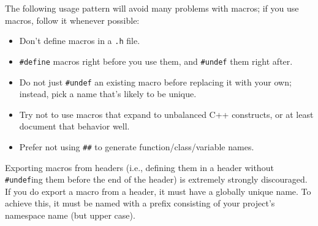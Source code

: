 The following usage pattern will avoid many problems with macros; if you use macros, follow it whenever possible:

\begin{itemize}
    \item Don't define macros in a \texttt{.h} file.
    \item \texttt{#define} macros right before you use them, and \texttt{#undef} them right after.
    \item Do not just \texttt{#undef} an existing macro before replacing it with your own; instead, pick a name that's likely to be unique.
    \item Try not to use macros that expand to unbalanced C++ constructs, or at least document that behavior well.
    \item Prefer not using \texttt{##} to generate function/class/variable names.
\end{itemize}

Exporting macros from headers (i.e., defining them in a header without \texttt{#undef}ing them before the end of the header) is extremely strongly discouraged. If you do export a macro from a header, it must have a globally unique name. To achieve this, it must be named with a prefix consisting of your project's namespace name (but upper case).

